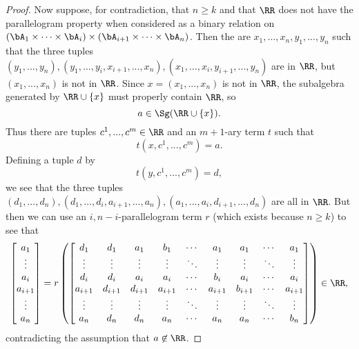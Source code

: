 \begin{proof}
Now suppose, for contradiction, that $n \ge k$ and that $\RR$ does not have the parallelogram property when considered as a binary relation on $(\bA_1 \times \cdots \times \bA_i)\times (\bA_{i+1} \times \cdots \times \bA_n)$. Then the are $x_1, ..., x_n, y_1, ..., y_n$ such that the three tuples $(y_1, ..., y_n), (y_1, ..., y_i, x_{i+1}, ..., x_n), (x_1, ..., x_i, y_{i+1}, ..., y_n)$ are in $\RR$, but $(x_1, ..., x_n)$ is not in $\RR$. Since $x = (x_1, ..., x_n)$ is not in $\RR$, the subalgebra generated by $\RR \cup \{x\}$ must properly contain $\RR$, so
\[
a \in \Sg(\RR \cup \{x\}).
\]
Thus there are tuples $c^1, ..., c^m \in \RR$ and an $m+1$-ary term $t$ such that
\[
t(x,c^1, ..., c^m) = a.
\]
Defining a tuple $d$ by
\[
t(y,c^1,..., c^m) = d,
\]
we see that the three tuples $(d_1, ..., d_n), (d_1, ..., d_i, a_{i+1}, ..., a_n), (a_1, ..., a_i, d_{i+1}, ..., d_n)$ are all in $\RR$. But then we can use an $i, n-i$-parallelogram term $r$ (which exists because $n \ge k$) to see that
\[
\begin{bmatrix} a_1\\ \vdots\\ a_i\\ a_{i+1}\\ \vdots\\ a_n \end{bmatrix} = r\left(\begin{bmatrix} d_1 & d_1 & a_1 & b_1 & \cdots & a_1 & a_1 & \cdots & a_1\\ \vdots & \vdots & \vdots & \vdots & \ddots & \vdots & \vdots & \ddots & \vdots\\ d_i & d_i & a_i & a_i & \cdots & b_i & a_i & \cdots & a_i\\ a_{i+1} & d_{i+1} & d_{i+1} & a_{i+1} & \cdots & a_{i+1} & b_{i+1} & \cdots & a_{i+1}\\ \vdots & \vdots & \vdots & \vdots & \ddots & \vdots & \vdots & \ddots & \vdots\\ a_n & d_n & d_n & a_n & \cdots & a_n & a_n & \cdots & b_n \end{bmatrix}\right) \in \RR,
\]
contradicting the assumption that $a \not\in \RR$.


\end{proof}
